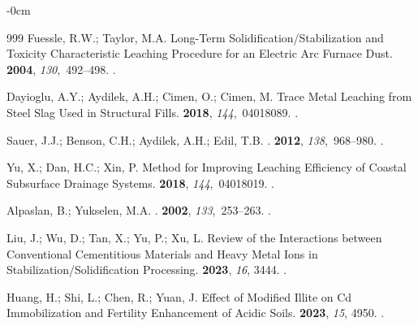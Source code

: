 \documentclass[algorithms,article,accept,pdftex,moreauthors]{Definitions/mdpi}
\begin{document}
\begin{adjustwidth}{-\extralength}{0cm}
\begin{thebibliography}{999}
Fuessle, R.W.; Taylor, M.A.
\newblock Long-Term Solidification/Stabilization and Toxicity Characteristic
  Leaching Procedure for an Electric Arc Furnace Dust.
 {\bf 2004}, {\em
  130},~492--498.
.

Dayioglu, A.Y.; Aydilek, A.H.; Cimen, O.; Cimen, M.
\newblock Trace Metal Leaching from Steel Slag Used in Structural Fills.
 {\bf
  2018}, {\em 144},~04018089.
.

Sauer, J.J.; Benson, C.H.; Aydilek, A.H.; Edil, T.B.
.
 {\bf
  2012}, {\em 138},~968--980.
.

Yu, X.; Dan, H.C.; Xin, P.
\newblock Method for Improving Leaching Efficiency of Coastal Subsurface
  Drainage Systems.
 {\bf 2018}, {\em
  144},~04018019.
.

Alpaslan, B.; Yukselen, M.A.
.
 {\bf 2002}, {\em 133},~253--263.
.

Liu, J.; Wu, D.; Tan, X.; Yu, P.; Xu, L.
\newblock Review of the Interactions between Conventional Cementitious
  Materials and Heavy Metal Ions in Stabilization/Solidification Processing.
 {\bf 2023}, {\em 16}, 3444.
.

Huang, H.; Shi, L.; Chen, R.; Yuan, J.
\newblock Effect of Modified Illite on Cd Immobilization and Fertility
  Enhancement of Acidic Soils.
 {\bf 2023}, {\em 15}, 4950.
.


\end{thebibliography}
\end{adjustwidth}
\end{document}
